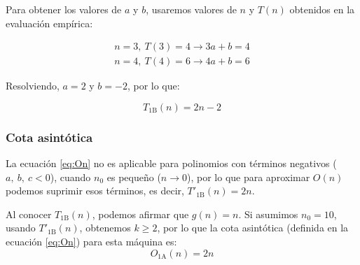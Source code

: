 Para obtener los valores de $a$ y $b$, usaremos valores de $n$ y $T(n)$ obtenidos en la evaluación empírica:

\begin{subequations}
    \begin{gather*}
        n = 3,\ T(3) = 4 \rightarrow 3a + b = 4 \\
        n = 4,\ T(4) = 6 \rightarrow 4a + b = 6
    \end{gather*}
\end{subequations}

Resolviendo, $a = 2$ y $b = -2$, por lo que:

\begin{equation}
    T_{\mathrm{1B}}(n) = 2n - 2
\end{equation}

\subsubsection*{Cota asintótica}
La ecuación \ref{eq:On} no es aplicable para polinomios con términos negativos ($a,\ b,\ c < 0$), cuando $n_0$ es pequeño ($n \rightarrow 0$), por lo que para aproximar $O(n)$ podemos suprimir esos términos, es decir, $T'_{\mathrm{1B}}(n) = 2n$.

Al conocer $T_{\mathrm{1B}}(n)$, podemos afirmar que $g(n) = n$. Si asumimos $n_0 = 10$, usando $T'_{\mathrm{1B}}(n)$, obtenemos $k \geq 2$, por lo que la cota asintótica (definida en la ecuación \ref{eq:On}) para esta máquina es:
\begin{equation}
    O_{\mathrm{1A}}(n) = 2n
\end{equation}

